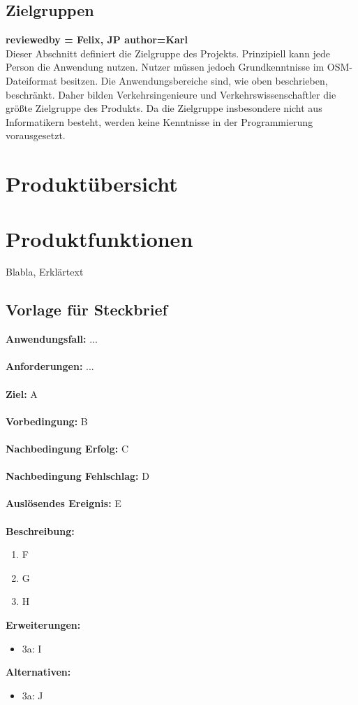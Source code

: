 \documentclass[parskip=full]{scrartcl} %
\begin{document}
\subsection{Zielgruppen}
\textbf{reviewedby = Felix, JP author=Karl\\}
Dieser Abschnitt definiert die Zielgruppe des Projekts. Prinzipiell kann jede Person die Anwendung nutzen. Nutzer müssen jedoch Grundkenntnisse im OSM-Dateiformat besitzen. Die Anwendungsbereiche sind, wie oben beschrieben, beschränkt. Daher bilden Verkehrsingenieure und Verkehrswissenschaftler die größte Zielgruppe des Produkts. Da die Zielgruppe insbesondere nicht aus Informatikern besteht, werden keine Kenntnisse in der Programmierung vorausgesetzt.


\newpage







\section{Produktübersicht}
\newpage










\section{Produktfunktionen}
Blabla, Erklärtext
\newpage

\subsection*{Vorlage für Steckbrief}
\textbf{Anwendungsfall:} ...\\\\
\textbf{Anforderungen:} ...\\\\
\textbf{Ziel:} A \\\\
\textbf{Vorbedingung:} B \\\\
\textbf{Nachbedingung Erfolg:} C \\\\
\textbf{Nachbedingung Fehlschlag:} D \\\\
\textbf{Auslösendes Ereignis:} E \\\\
\textbf{Beschreibung:}
\begin{enumerate}
    \item F
    \item G
    \item H
\end{enumerate}
\textbf{Erweiterungen:} 
\begin{itemize}
    \item 3a: I
\end{itemize}
\textbf{Alternativen:} 
\begin{itemize}
    \item 3a: J
\end{itemize}
\newpage
\end{document}
